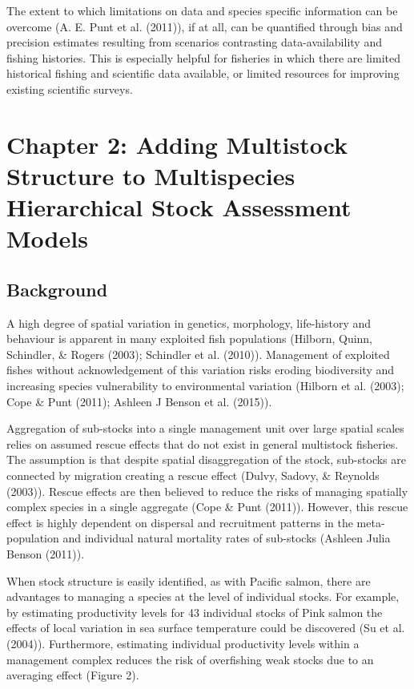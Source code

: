 \documentclass[12pt,]{scrartcl}
\begin{document}
The extent to which limitations on data and species specific information
can be overcome (A. E. Punt et al. (2011)), if at all, can be quantified
through bias and precision estimates resulting from scenarios
contrasting data-availability and fishing histories. This is especially
helpful for fisheries in which there are limited historical fishing and
scientific data available, or limited resources for improving existing
scientific surveys.

\section{Chapter 2: Adding Multistock Structure to Multispecies
Hierarchical Stock Assessment
Models}\label{chapter-2-adding-multistock-structure-to-multispecies-hierarchical-stock-assessment-models}

\subsection{Background}\label{background-2}

A high degree of spatial variation in genetics, morphology, life-history
and behaviour is apparent in many exploited fish populations (Hilborn,
Quinn, Schindler, \& Rogers (2003); Schindler et al. (2010)). Management
of exploited fishes without acknowledgement of this variation risks
eroding biodiversity and increasing species vulnerability to
environmental variation (Hilborn et al. (2003); Cope \& Punt (2011);
Ashleen J Benson et al. (2015)).

Aggregation of sub-stocks into a single management unit over large
spatial scales relies on assumed rescue effects that do not exist in
general multistock fisheries. The assumption is that despite spatial
disaggregation of the stock, sub-stocks are connected by migration
creating a rescue effect (Dulvy, Sadovy, \& Reynolds (2003)). Rescue
effects are then believed to reduce the risks of managing spatially
complex species in a single aggregate (Cope \& Punt (2011)). However,
this rescue effect is highly dependent on dispersal and recruitment
patterns in the meta-population and individual natural mortality rates
of sub-stocks (Ashleen Julia Benson (2011)).

When stock structure is easily identified, as with Pacific salmon, there
are advantages to managing a species at the level of individual stocks.
For example, by estimating productivity levels for 43 individual stocks
of Pink salmon the effects of local variation in sea surface temperature
could be discovered (Su et al. (2004)). Furthermore, estimating
individual productivity levels within a management complex reduces the
risk of overfishing weak stocks due to an averaging effect (Figure 2).
\end{document}
